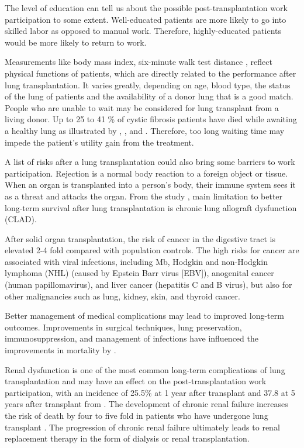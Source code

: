 \documentclass[11pt, a4paper]{article}\usepackage[]{graphicx}\usepackage[]{color}
\begin{document}
The level of education can tell us about the possible post-transplantation work participation to some extent. Well-educated patients are more likely to go into skilled labor as opposed to manual work. Therefore, highly-educated patients would be more likely to return to work. 

Measurements like body mass index, six-minute walk test distance \citep{tuppin2008predictive}, reflect physical functions of patients, which are directly related to the performance after lung transplantation. It varies greatly, depending on age, blood type, the status of the lung of patients and the availability of a donor lung that is a good match. People who are unable to wait may be considered for lung transplant from a living donor. Up to 25 to 41 \% of cystic fibrosis patients have died while awaiting a healthy lung as illustrated by \cite{vizza2000outcome}, \cite{sharples1993prognosis}, \cite{stanchina2002association} and \cite{ciriaco1995analysis}. Therefore, too long waiting time may impede the patient's utility gain from the treatment. 


A list of risks after a lung transplantation could also bring some barriers to work participation. Rejection is a normal body reaction to a foreign object or tissue. When an organ is transplanted into a person's body, their immune system sees it as a threat and attacks the organ. From the study \cite{derhovanessian2018chronic}, main limitation to better long-term survival after lung transplantation is chronic lung allograft dysfunction (CLAD). 

After solid organ transplantation, the risk of cancer in the digestive tract is elevated 2-4 fold compared with population controls. The high risks for cancer are associated with viral infections, including Mb, Hodgkin and non-Hodgkin lymphoma (NHL) (caused by Epstein Barr virus [EBV]), anogenital cancer (human papillomavirus), and liver cancer (hepatitis C and B virus), but also for other malignancies such as lung, kidney, skin, and thyroid cancer.

Better management of medical complications may lead to improved long-term outcomes. Improvements in surgical techniques, lung preservation, immunosuppression, and management of infections have influenced the improvements in mortality by \cite{trulock2007registry}. 

Renal dysfunction is one of the most common long-term complications of lung transplantation and may have an effect on the post-transplantation work participation, with an incidence of 25.5\% at 1 year after transplant and 37.8 at 5 years after transplant from \cite{trulock2007registry}. The development of chronic renal failure increases the risk of death by four to five fold in patients who have undergone lung transplant \citep{ojo2003chronic}. The progression of chronic renal failure ultimately leads to renal replacement therapy in the form of dialysis or renal transplantation. 
\end{document}
